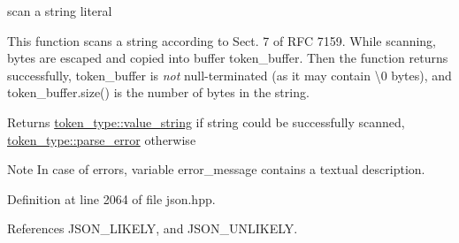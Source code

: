 scan a string literal 

This function scans a string according to Sect. 7 of R\+FC 7159. While scanning, bytes are escaped and copied into buffer token\+\_\+buffer. Then the function returns successfully, token\+\_\+buffer is {\itshape not} null-\/terminated (as it may contain \textbackslash{}0 bytes), and token\+\_\+buffer.\+size() is the number of bytes in the string.

\begin{DoxyReturn}{Returns}
\hyperlink{classnlohmann_1_1detail_1_1lexer_a3f313cdbe187cababfc5e06f0b69b098a2b490e8bf366b4cbe3ebd99b26ce15ce}{token\+\_\+type\+::value\+\_\+string} if string could be successfully scanned, \hyperlink{classnlohmann_1_1detail_1_1lexer_a3f313cdbe187cababfc5e06f0b69b098a456e19aeafa334241c7ff3f589547f9d}{token\+\_\+type\+::parse\+\_\+error} otherwise
\end{DoxyReturn}
\begin{DoxyNote}{Note}
In case of errors, variable error\+\_\+message contains a textual description. 
\end{DoxyNote}


Definition at line 2064 of file json.\+hpp.



References J\+S\+O\+N\+\_\+\+L\+I\+K\+E\+LY, and J\+S\+O\+N\+\_\+\+U\+N\+L\+I\+K\+E\+LY.



